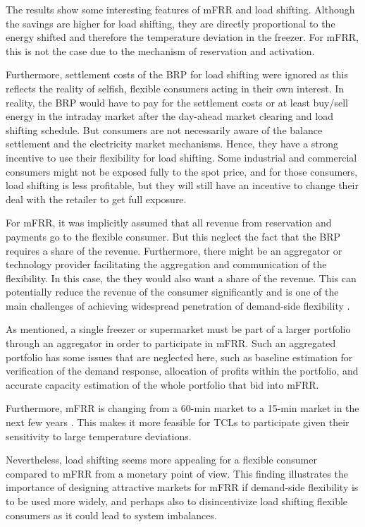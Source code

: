 The results show some interesting features of mFRR and load shifting. Although the savings are higher for load shifting, they are directly proportional to the energy shifted and therefore the temperature deviation in the freezer. For mFRR, this is not the case due to the mechanism of reservation and activation.

Furthermore, settlement costs of the BRP for load shifting were ignored as this reflects the reality of selfish, flexible consumers acting in their own interest. In reality, the BRP would have to pay for the settlement costs or at least buy/sell energy in the intraday market after the day-ahead market clearing and load shifting schedule. But consumers are not necessarily aware of the balance settlement and the electricity market mechanisms. Hence, they have a strong incentive to use their flexibility for load shifting. Some industrial and commercial consumers might not be exposed fully to the spot price, and for those consumers, load shifting is less profitable, but they will still have an incentive to change their deal with the retailer to get full exposure.

For mFRR, it was implicitly assumed that all revenue from reservation and payments go to the flexible consumer. But this neglect the fact that the BRP requires a share of the revenue. Furthermore, there might be an aggregator or technology provider facilitating the aggregation and communication of the flexibility. In this case, the they would also want a share of the revenue. This can potentially reduce the revenue of the consumer significantly and is one of the main challenges of achieving widespread penetration of demand-side flexibility \cite{gade2022ecosystem}.

As mentioned, a single freezer or supermarket must be part of a larger portfolio through an aggregator in order to participate in mFRR. Such an aggregated portfolio has some issues that are neglected here, such as baseline estimation for verification of the demand response, allocation of profits within the portfolio, and accurate capacity estimation of the whole portfolio that bid into mFRR.

Furthermore, mFRR is changing from a 60-min market to a 15-min market in the next few years \cite{MARI}. This makes it more feasible for TCLs to participate given their sensitivity to large temperature deviations.

Nevertheless, load shifting seems more appealing for a flexible consumer compared to mFRR from a monetary point of view. This finding illustrates the importance of designing attractive markets for mFRR if demand-side flexibility is to be used more widely, and perhaps also to disincentivize load shifting flexible consumers as it could lead to system imbalances.


